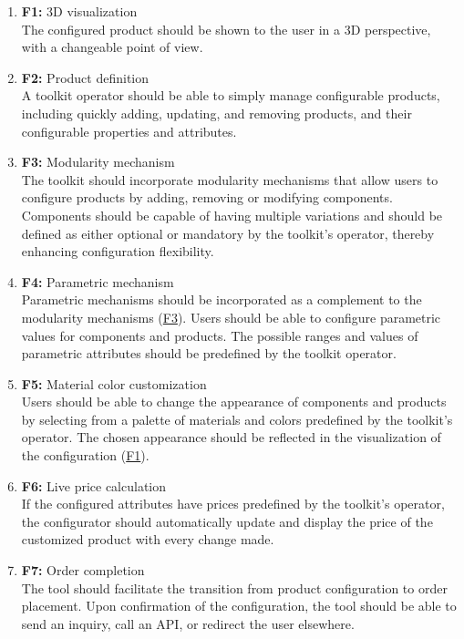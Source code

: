 \begin{enumerate}
\item \textbf{F1:}\label{itm:F1} 3D visualization
\\The configured product should be shown to the user in a 3D perspective, with a changeable point of view. 

\item \textbf{F2:} Product definition
\\A toolkit operator should be able to simply manage configurable products, including quickly adding, updating, and removing products, and their configurable properties and attributes.

\item \textbf{F3:}\label{itm:F3} Modularity mechanism
\\The toolkit should incorporate modularity mechanisms that allow users to configure products by adding, removing or modifying components. Components should be capable of having multiple variations and should be defined as either optional or mandatory by the toolkit's operator, thereby enhancing configuration flexibility.

\item \textbf{F4:} Parametric mechanism
\\Parametric mechanisms should be incorporated as a complement to the modularity mechanisms (\hyperref[itm:F3]{F3}). Users should be able to configure parametric values for components and products. The possible ranges and values of parametric attributes should be predefined by the toolkit operator.

\item \textbf{F5:} Material color customization
\\Users should be able to change the appearance of components and products by selecting from a palette of materials and colors predefined by the toolkit's operator. The chosen appearance should be reflected in the visualization of the configuration (\hyperref[itm:F1]{F1}).

\item \textbf{F6:} Live price calculation
\\If the configured attributes have prices predefined by the toolkit's operator, the configurator should automatically update and display the price of the customized product with every change made.

\item \textbf{F7:} Order completion
\\The tool should facilitate the transition from product configuration to order placement. Upon confirmation of the configuration, the tool should be able to send an inquiry, call an API, or redirect the user elsewhere.


\end{enumerate}
